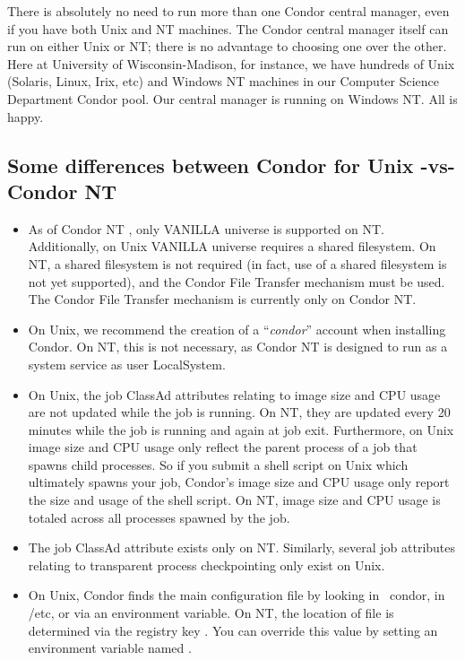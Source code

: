 There is absolutely no need to run more than one Condor central manager,
even if you have both Unix and NT machines.  The Condor central manager
itself can run on either Unix or NT; there is no advantage to choosing
one over the other.  Here at University of Wisconsin-Madison, for
instance, we have hundreds of Unix (Solaris, Linux, Irix, etc) and
Windows NT machines in our Computer Science Department Condor pool.
Our central manager is running on Windows NT.  All is happy.

\subsection{Some differences between Condor for Unix -vs- Condor NT}

\begin{itemize}

\item As of Condor NT \VersionNotice, only VANILLA universe is
supported on NT.  Additionally, on Unix VANILLA universe requires
a shared filesystem.  On NT, a shared filesystem is not required (in
fact, use of a shared filesystem is not yet supported), and the Condor
File Transfer mechanism must be used. \Note The Condor File Transfer
mechanism is currently only on Condor NT.

\item On Unix, we recommend the creation of a ``\textit{condor}'' account
when installing Condor.  On NT, this is not necessary, as Condor NT is
designed to run as a system service as user LocalSystem.

\item On Unix, the job ClassAd attributes relating to image size and
CPU usage are not updated while the job is running.  On NT, they are
updated every 20 minutes while the job is running and again at job exit.
Furthermore, on Unix image size and CPU usage only reflect the parent
process of a job that spawns child processes.  So if you submit a
shell script on Unix which ultimately spawns your job, Condor's image
size and CPU usage only report the size and usage of the shell script.
On NT, image size and CPU usage is totaled across all processes spawned
by the job.

\item The job ClassAd attribute  exists only on NT.
Similarly, several job attributes relating to transparent process
checkpointing only exist on Unix.

\item On Unix, Condor finds the  main configuration
file by looking in ~condor, in /etc, or via an environment variable.
On NT, the location of  file is determined
via the registry key .
You can override this value by setting an environment variable named
.


\end{itemize}
